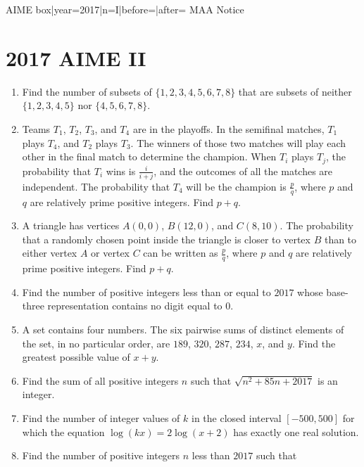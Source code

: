 \documentclass{article}
\begin{document}
\begin{enumerate}[label=\arabic*., itemsep=0.5em]
{{AIME box|year=2017|n=I|before=|after=}}
{{MAA Notice}}\par \vspace{0.5em}\end{enumerate}\newpage\section*{2017 AIME II}\begin{enumerate}[label=\arabic*., itemsep=0.5em]\item Find the number of subsets of $\{1, 2, 3, 4, 5, 6, 7, 8\}$ that are subsets of neither $\{1, 2, 3, 4, 5\}$ nor $\{4, 5, 6, 7, 8\}$.\par \vspace{0.5em}\item Teams $T_1$, $T_2$, $T_3$, and $T_4$ are in the playoffs. In the semifinal matches, $T_1$ plays $T_4$, and $T_2$ plays $T_3$. The winners of those two matches will play each other in the final match to determine the champion. When $T_i$ plays $T_j$, the probability that $T_i$ wins is $\frac{i}{i+j}$, and the outcomes of all the matches are independent. The probability that $T_4$ will be the champion is $\frac{p}{q}$, where $p$ and $q$ are relatively prime positive integers. Find $p+q$.\par \vspace{0.5em}\item A triangle has vertices $A(0,0)$, $B(12,0)$, and $C(8,10)$. The probability that a randomly chosen point inside the triangle is closer to vertex $B$ than to either vertex $A$ or vertex $C$ can be written as $\frac{p}{q}$, where $p$ and $q$ are relatively prime positive integers. Find $p+q$.\par \vspace{0.5em}\item Find the number of positive integers less than or equal to $2017$ whose base-three representation contains no digit equal to $0$.\par \vspace{0.5em}\item A set contains four numbers. The six pairwise sums of distinct elements of the set, in no particular order, are $189$, $320$, $287$, $234$, $x$, and $y$. Find the greatest possible value of $x+y$.\par \vspace{0.5em}\item Find the sum of all positive integers $n$ such that $\sqrt{n^2+85n+2017}$ is an integer.\par \vspace{0.5em}\item Find the number of integer values of $k$ in the closed interval $[-500,500]$ for which the equation $\log(kx)=2\log(x+2)$ has exactly one real solution.\par \vspace{0.5em}\item Find the number of positive integers $n$ less than $2017$ such that 

\end{enumerate}
\end{document}
